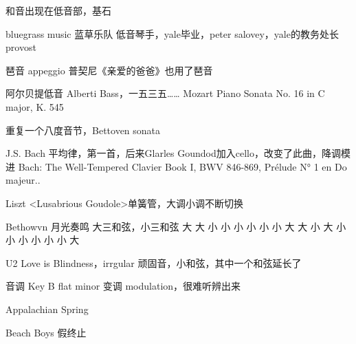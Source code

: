 和音出现在低音部，基石

bluegrass music 蓝草乐队
低音琴手，yale毕业，peter salovey，yale的教务处长 provost

琶音 appeggio
普契尼《亲爱的爸爸》也用了琶音

阿尔贝提低音 Alberti Bass，一五三五……
Mozart Piano Sonata No. 16 in C major, K. 545

重复一个八度音节，Bettoven sonata

J.S. Bach 平均律，第一首，后来Glarles Goundod加入cello，改变了此曲，降调模进
Bach: The Well-Tempered Clavier Book I, BWV 846-869, Prélude N° 1 en Do majeur..

Liszt <Lusabrious Goudole>单簧管，大调小调不断切换

Bethowvn 月光奏鸣 大三和弦，小三和弦
大 大 小 小 小
小 小 小 大 大
小 大 小 小 小
小 小 小 大

U2 Love is Blindness，irrgular
顽固音，小和弦，其中一个和弦延长了

音调 Key B flat minor
变调 modulation，很难听辨出来

Appalachian Spring

Beach Boys 假终止